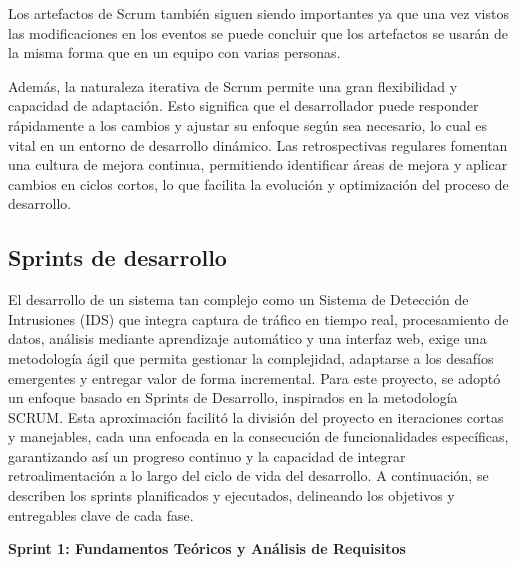 Los artefactos de Scrum también siguen siendo importantes ya que una vez
vistos las modificaciones en los eventos se puede concluir que los artefactos se usarán de la misma forma que en un equipo con varias personas. 

Además, la naturaleza iterativa de Scrum permite una gran flexibilidad y
capacidad de adaptación. Esto significa que el desarrollador puede responder rápidamente a los cambios y ajustar su enfoque según sea necesario, lo cual es vital en un entorno de desarrollo dinámico. Las retrospectivas regulares fomentan una cultura de mejora continua, permitiendo identificar áreas de mejora y aplicar cambios en ciclos cortos, lo que facilita la evolución y optimización del proceso de desarrollo.

\subsection{Sprints de desarrollo}\label{Sec.Sprints}
El desarrollo de un sistema tan complejo como un Sistema de Detección de Intrusiones (IDS) que integra captura de tráfico en tiempo real, procesamiento de datos, análisis mediante aprendizaje automático y una interfaz web, exige una metodología ágil que permita gestionar la complejidad, adaptarse a los desafíos emergentes y entregar valor de forma incremental. Para este proyecto, se adoptó un enfoque basado en Sprints de Desarrollo, inspirados en la metodología SCRUM. Esta aproximación facilitó la división del proyecto en iteraciones cortas y manejables, cada una enfocada en la consecución de funcionalidades específicas, garantizando así un progreso continuo y la capacidad de integrar retroalimentación a lo largo del ciclo de vida del desarrollo. A continuación, se describen los sprints planificados y ejecutados, delineando los objetivos y entregables clave de cada fase.


\textbf{Sprint 1: Fundamentos Teóricos y Análisis de Requisitos}

